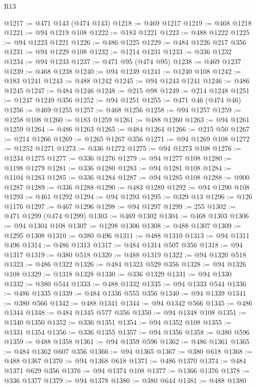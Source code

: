 \begin{lexlean}{R13}
\begin{coremodule}
@1217 := @471 @143 (@474 @143)
@1218 := @469 @1217
@1219 := @468 @1218
@1221 := @94 @1219 @108
@1222 := @183 @1221
@1223 := @488 @1222
@1225 := @94 @1223 @1221
@1226 := @486 @1225
@1229 := @484 @1226 @217 @356
@1231 := @94 @1229 @108
@1232 := @1214 @1231
@1233 := @336 @1232
@1234 := @94 @1233
@1237 := @471 @95 (@474 @95)
@1238 := @469 @1237
@1239 := @468 @1238
@1240 := @94 @1239
@1241 := @1240 @108
@1242 := @183 @1241
@1243 := @488 @1242
@1245 := @94 @1243 @1241
@1246 := @486 @1245
@1247 := @484 @1246
@1248 := @215 @98
@1249 := @214 @1248
@1251 := @1247 @1249 @356
@1252 := @94 @1251
@1255 := @471 @46 (@474 @46)
@1256 := @469 @1255
@1257 := @468 @1256
@1258 := @94 @1257
@1259 := @1258 @108
@1260 := @183 @1259
@1261 := @488 @1260
@1263 := @94 @1261 @1259
@1264 := @486 @1263
@1265 := @484 @1264
@1266 := @215 @50
@1267 := @214 @1266
@1269 := @1265 @1267 @356
@1271 := @94 @1269 @108
@1272 := @1252 @1271
@1273 := @336 @1272
@1275 := @94 @1273 @108
@1276 := @1234 @1275
@1277 := @336 @1276
@1279 := @94 @1277 @108
@1280 := @1198 @1279
@1281 := @336 @1280
@1283 := @94 @1281 @108
@1284 := @1104 @1283
@1285 := @336 @1284
@1287 := @94 @1285 @108
@1288 := @900 @1287
@1289 := @336 @1288
@1290 := @483 @1289
@1292 := @94 @1290 @108
@1293 := @461 @1292
@1294 := @94 @1293
@1295 := @329 @13
@1296 := @126 @1176
@1297 := @467 @1296
@1298 := @94 @1297
@1299 := 255
@1302 := @471 @1299 (@474 @1299)
@1303 := @469 @1302
@1304 := @468 @1303
@1306 := @94 @1304 @108
@1307 := @1298 @1306
@1308 := @488 @1307
@1309 := @1295 @1308
@1310 := @380 @496
@1311 := @488 @1310
@1313 := @94 @1311 @496
@1314 := @486 @1313
@1317 := @484 @1314 @507 @356
@1318 := @94 @1317
@1319 := @380 @518
@1320 := @488 @1319
@1322 := @94 @1320 @518
@1323 := @486 @1322
@1326 := @484 @1323 @529 @356
@1328 := @94 @1326 @108
@1329 := @1318 @1328
@1330 := @336 @1329
@1331 := @94 @1330
@1332 := @380 @544
@1333 := @488 @1332
@1335 := @94 @1333 @544
@1336 := @486 @1335
@1339 := @484 @1336 @555 @356
@1340 := @94 @1339
@1341 := @380 @566
@1342 := @488 @1341
@1344 := @94 @1342 @566
@1345 := @486 @1344
@1348 := @484 @1345 @577 @356
@1350 := @94 @1348 @108
@1351 := @1340 @1350
@1352 := @336 @1351
@1354 := @94 @1352 @108
@1355 := @1331 @1354
@1356 := @336 @1355
@1357 := @94 @1356
@1358 := @380 @596
@1359 := @488 @1358
@1361 := @94 @1359 @596
@1362 := @486 @1361
@1365 := @484 @1362 @607 @356
@1366 := @94 @1365
@1367 := @380 @618
@1368 := @488 @1367
@1370 := @94 @1368 @618
@1371 := @486 @1370
@1374 := @484 @1371 @629 @356
@1376 := @94 @1374 @108
@1377 := @1366 @1376
@1378 := @336 @1377
@1379 := @94 @1378
@1380 := @380 @644
@1381 := @488 @1380

\end{coremodule}
\end{lexlean}
